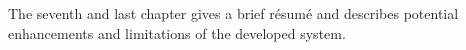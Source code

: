The seventh and last chapter gives a brief résumé and describes potential enhancements and limitations of the developed system.
%
%
%
%
